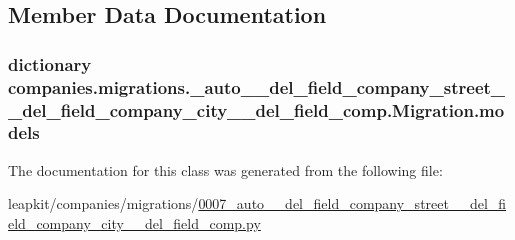 \subsection{Member Data Documentation}
\hypertarget{classcompanies_1_1migrations_1_10007__auto____del__field__company__street____del__field__company22fc2f9c6f942cc3a3eb71c9155c8d7d_a7038725891e4f316f2885e5a8a694553}{
\subsubsection[{models}]{\setlength{\rightskip}{0pt plus 5cm}dictionary companies.\-migrations.\-\_\-auto\-\_\-\-\_\-del\-\_\-field\-\_\-company\-\_\-street\-\_\-\-\_\-del\-\_\-field\-\_\-company\-\_\-city\-\_\-\-\_\-del\-\_\-field\-\_\-comp.\-Migration.\-models\hspace{0.3cm}{\ttfamily [static]}}}\label{classcompanies_1_1migrations_1_10007__auto____del__field__company__street____del__field__company22fc2f9c6f942cc3a3eb71c9155c8d7d_a7038725891e4f316f2885e5a8a694553}


The documentation for this class was generated from the following file\-:\begin{DoxyCompactItemize}
\item 
leapkit/companies/migrations/\hyperlink{0007__auto____del__field__company__street____del__field__company__city____del__field__comp_8py}{0007\-\_\-auto\-\_\-\-\_\-del\-\_\-field\-\_\-company\-\_\-street\-\_\-\-\_\-del\-\_\-field\-\_\-company\-\_\-city\-\_\-\-\_\-del\-\_\-field\-\_\-comp.\-py}\end{DoxyCompactItemize}

